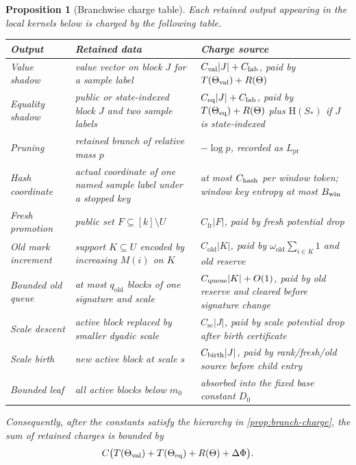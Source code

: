\documentclass[11pt]{article}
\newcommand{\Cref}[1]{\ref{#1}}
\newtheorem{proposition}[theorem]{Proposition}
\theoremstyle{remark}
\newcommand{\HH}{\mathrm H}
\newcommand{\pr}{\mathrm{pr}}
\newcommand{\old}{\mathrm{old}}
\newcommand{\fr}{\mathrm{fr}}
\newcommand{\scal}{\mathrm{sc}}
\begin{document}
\begin{proposition}[Branchwise charge table]\label{prop:appendix-charge-table}
Each retained output appearing in the local kernels below is charged by the following table.
\begin{center}
\begin{longtable}{>{\raggedright\arraybackslash}p{}>{\raggedright\arraybackslash}p{}>{\raggedright\arraybackslash}p{}}
\toprule
Output & Retained data & Charge source \\
\midrule
Value shadow & value vector on block $J$ for a sample label & $C_{\rm val}|J|+C_{\rm lab}$, paid by $T(\Theta_{\rm val})+R(\Theta)$ \\
Equality shadow & public or state-indexed block $J$ and two sample labels & $C_{\rm eq}|J|+C_{\rm lab}$, paid by $T(\Theta_{\rm eq})+R(\Theta)$ plus $\HH(S_*)$ if $J$ is state-indexed \\
Pruning & retained branch of relative mass $p$ & $-\log p$, recorded as $L_{\pr}$ \\
Hash coordinate & actual coordinate of one named sample label under a stopped key & at most $C_{\rm hash}$ per window token; window key entropy at most $B_{\rm win}$ \\
Fresh promotion & public set $F\subseteq [k]\setminus U$ & $C_{\fr}|F|$, paid by fresh potential drop \\
Old mark increment & support $K\subseteq U$ encoded by increasing $M(i)$ on $K$ & $C_{\old}|K|$, paid by $\omega_{\old}\sum_{i\in K}1$ and old reserve \\
Bounded old queue & at most $q_{\old}$ blocks of one signature and scale & $C_{\rm queue}|K|+O(1)$, paid by old reserve and cleared before signature change \\
Scale descent & active block replaced by smaller dyadic scale & $C_{\scal}|J|$, paid by scale potential drop after birth certificate \\
Scale birth & new active block at scale $s$ & $C_{\rm birth}|J|$, paid by rank/fresh/old source before child entry \\
Bounded leaf & all active blocks below $m_0$ & absorbed into the fixed base constant $D_0$ \\
\bottomrule
\end{longtable}
\end{center}
Consequently, after the constants satisfy the hierarchy in \Cref{prop:branch-charge}, the sum of retained charges is bounded by
\[
        C\bigl(T(\Theta_{\rm val})+T(\Theta_{\rm eq})+R(\Theta)+\Delta\Phi\bigr).
\]
\end{proposition}
\end{document}
